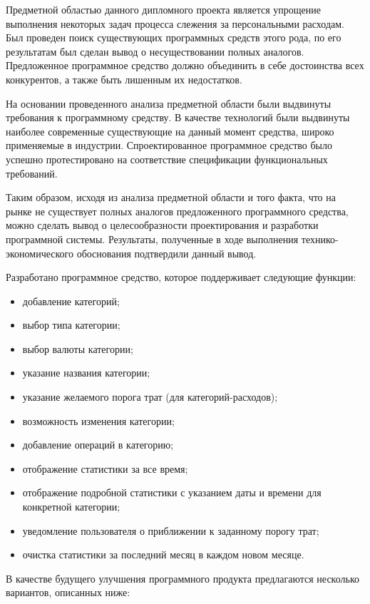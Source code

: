 
Предметной областью данного дипломного проекта является упрощение выполнения некоторых задач процесса слежения за персональными расходам. Был проведен поиск существующих программных средств этого рода, по его результатам был сделан вывод о несуществовании полных аналогов. Предложенное программное средство должно объединить в себе достоинства всех конкурентов, а также быть лишенным их недостатков.

На основании проведенного анализа предметной области были выдвинуты требования к программному средству. В качестве технологий были выдвинуты наиболее современные существующие на данный момент средства, широко применяемые в индустрии. Спроектированное программное средство было успешно протестировано на соответствие спецификации функциональных требований. 

Таким образом, исходя из анализа предметной области и того факта, что на рынке не существует полных аналогов предложенного программного средства, можно сделать вывод о целесообразности проектирования и разработки программной системы. Результаты, полученные в ходе выполнения технико-экономического обоснования подтвердили данный вывод.

Разработано программное средство, которое поддерживает следующие функции:
\begin{itemize}
	\item добавление категорий;
	\item выбор типа категории;
	\item выбор валюты категории;
	\item указание названия категории;
	\item указание желаемого порога трат (для категорий-расходов);
	\item возможность изменения категории;
	\item добавление операций в категорию;
	\item отображение статистики за все время;
	\item отображение подробной статистики с указанием даты и времени для конкретной категории;
	\item уведомление пользователя о приближении к заданному порогу трат;
	\item очистка статистики за последний месяц в каждом новом месяце.
\end{itemize}

В качестве будущего улучшения программного продукта предлагаются несколько вариантов, описанных ниже:

